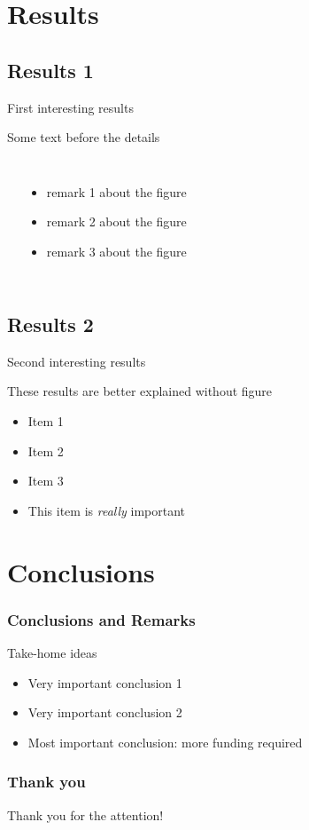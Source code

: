 \documentclass[xcolor=dvipsnames]{beamer}
\begin{document}
\section{Results} 
\subsection{Results 1} 

\begin{frame}{First interesting results}
  
  Some text before the details

  \vfill

  \begin{columns}
    \rule{\linewidth}{10em}
    \begin{itemize}[<+->]
      \item remark 1 about the figure
      \item remark 2 about the figure
      \item remark 3 about the figure
    \end{itemize}
  \end{columns}
\end{frame}

\subsection{Results 2} 

\begin{frame}{Second interesting results}
  \begin{block}{These results are better explained without figure}
    \begin{itemize}
      \item Item 1 
      \item Item 2 
      \item Item 3 
      \item \alert<2>{This item is {\it really} important}
    \end{itemize}
  \end{block}
\end{frame}


\section{Conclusions}

\begin{frame}
  \frametitle{Conclusions and Remarks}
  \begin{block}{Take-home ideas}
    \begin{itemize}
      \item Very important conclusion 1
      \item Very important conclusion 2
      \item Most important conclusion: \alert{more funding required}
    \end{itemize}
  \end{block}
\end{frame}

\begin{frame}
  \frametitle{Thank you}
  \begin{center}
  \alert{\Huge Thank you for the attention!}
  \end{center}
\end{frame}
\end{document}
